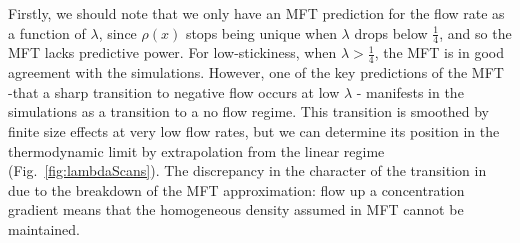 \documentclass[
reprint,
 amsmath,amssymb,
 aps,
 prl,
]{revtex4-1}
\begin{document}
Firstly, we should note that we only have an MFT prediction for the flow rate as a function of $\lambda$, since $\rho(x)$ stops being unique when $\lambda$ drops below $\frac{1}{4}$,
and so the MFT lacks predictive power. For low-stickiness, when $\lambda>\frac{1}{4}$, the MFT is in good agreement with the simulations.
However, one of the key predictions of the MFT -that a sharp transition to negative flow occurs at low $\lambda$ - manifests in the simulations as a transition to a no flow regime.
This transition is smoothed by finite size effects at very low flow rates, but we can determine its position in the thermodynamic limit  by extrapolation from the linear regime (Fig.~\ref{fig:lambdaScans}).
The discrepancy in the character of the transition in due to the breakdown of the MFT approximation: flow up a concentration gradient means that the homogeneous density assumed in MFT cannot be maintained.
\end{document}

